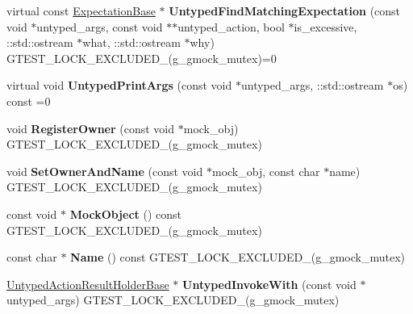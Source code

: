 \begin{DoxyCompactItemize}
\item 
\mbox{\label{classtesting_1_1internal_1_1_untyped_function_mocker_base_a38714b44836c937fe95524f8d7063d04}} 
virtual const \hyperlink{classtesting_1_1internal_1_1_expectation_base}{Expectation\+Base} $\ast$ {\bfseries Untyped\+Find\+Matching\+Expectation} (const void $\ast$untyped\+\_\+args, const void $\ast$$\ast$untyped\+\_\+action, bool $\ast$is\+\_\+excessive, \+::std\+::ostream $\ast$what, \+::std\+::ostream $\ast$why) G\+T\+E\+S\+T\+\_\+\+L\+O\+C\+K\+\_\+\+E\+X\+C\+L\+U\+D\+E\+D\+\_\+(g\+\_\+gmock\+\_\+mutex)=0
\item 
\mbox{\label{classtesting_1_1internal_1_1_untyped_function_mocker_base_ae8c91f05fc90e66a84df49aae8de0d41}} 
virtual void {\bfseries Untyped\+Print\+Args} (const void $\ast$untyped\+\_\+args, \+::std\+::ostream $\ast$os) const =0
\item 
\mbox{\label{classtesting_1_1internal_1_1_untyped_function_mocker_base_a0cd3dd14b92c714eab690c9597f32ffd}} 
void {\bfseries Register\+Owner} (const void $\ast$mock\+\_\+obj) G\+T\+E\+S\+T\+\_\+\+L\+O\+C\+K\+\_\+\+E\+X\+C\+L\+U\+D\+E\+D\+\_\+(g\+\_\+gmock\+\_\+mutex)
\item 
\mbox{\label{classtesting_1_1internal_1_1_untyped_function_mocker_base_a287bcacee639b7d123cec29e0614fe96}} 
void {\bfseries Set\+Owner\+And\+Name} (const void $\ast$mock\+\_\+obj, const char $\ast$name) G\+T\+E\+S\+T\+\_\+\+L\+O\+C\+K\+\_\+\+E\+X\+C\+L\+U\+D\+E\+D\+\_\+(g\+\_\+gmock\+\_\+mutex)
\item 
\mbox{\label{classtesting_1_1internal_1_1_untyped_function_mocker_base_a71863dd67193a7082078d5b366d5ce51}} 
const void $\ast$ {\bfseries Mock\+Object} () const G\+T\+E\+S\+T\+\_\+\+L\+O\+C\+K\+\_\+\+E\+X\+C\+L\+U\+D\+E\+D\+\_\+(g\+\_\+gmock\+\_\+mutex)
\item 
\mbox{\label{classtesting_1_1internal_1_1_untyped_function_mocker_base_ae90a5b5d48db1e99634bc6ff39ded335}} 
const char $\ast$ {\bfseries Name} () const G\+T\+E\+S\+T\+\_\+\+L\+O\+C\+K\+\_\+\+E\+X\+C\+L\+U\+D\+E\+D\+\_\+(g\+\_\+gmock\+\_\+mutex)
\item 
\mbox{\label{classtesting_1_1internal_1_1_untyped_function_mocker_base_adaec41c0ba8a07c2415f6c8efa0ca54f}} 
\hyperlink{classtesting_1_1internal_1_1_untyped_action_result_holder_base}{Untyped\+Action\+Result\+Holder\+Base} $\ast$ {\bfseries Untyped\+Invoke\+With} (const void $\ast$untyped\+\_\+args) G\+T\+E\+S\+T\+\_\+\+L\+O\+C\+K\+\_\+\+E\+X\+C\+L\+U\+D\+E\+D\+\_\+(g\+\_\+gmock\+\_\+mutex)
\end{DoxyCompactItemize}
